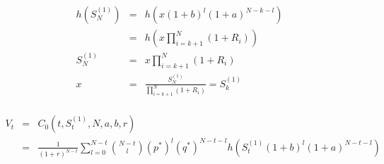 \documentclass[12pt]{article}
\newenvironment{solution}[2][Solution]{\begin{trivlist}
\item[\hskip \labelsep {\bfseries #1}\hskip \labelsep {\bfseries #2.}]}{\end{trivlist}}
\newenvironment{question}[2][Question]{\begin{trivlist}
\item[\hskip \labelsep {\bfseries #1}\hskip \labelsep {\bfseries #2.}]}{\end{trivlist}}
\begin{document}
\newpage
\begin{question}{6}
\end{question}
\begin{solution}[Solution]\\ 

\begin{eqnarray*}
h(S_N^{(1)}) &=& h\left(x(1+b)^l (1+a)^{N-k-l}\right) \\
&=& h\left(x \prod^{N}_{i=k+1} (1+R_i) \right) \\
S_N^{(1)} &=& x \prod^{N}_{i=k+1} (1+R_i) \\
x &=& \frac{S_N^{(1)}}{\prod^{N}_{i=k+1} (1+R_i)} = S_k^{(1)}
\end{eqnarray*}\\
\begin{eqnarray*}
V_t &=& C_0(t,S_t^{(1)},N,a,b,r) \\
&=& \frac{1}{(1+r)^{N-t}} \sum^{N-t}_{l=0} \binom{N-t}{l} (p^*)^l (q^*)^{N-t-l} h\left(S_t^{(1)}(1+b)^l (1+a)^{N-t-l}\right)
\end{eqnarray*}
\end{solution}
\end{document}
